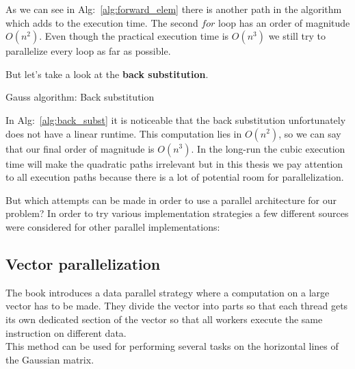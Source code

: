 \documentclass[draft, final]{vutinfth} %
\begin{document}
		As we can see in Alg:~\ref{alg:forward_elem} there is another path in the algorithm which adds to the execution time. The second $for$ loop has an order of magnitude $O(n^2)$. Even though the practical execution time is $O(n^3)$ we still try to parallelize every loop as far as possible.

		But let's take a look at the \textbf{back substitution}.
		\begin{algorithm}[!ht]
			\BlankLine


			\caption{Gauss algorithm: Back substitution}
			\label{alg:back_subst}
		\end{algorithm}

		In Alg:~\ref{alg:back_subst} it is noticeable that the back substitution unfortunately does not have a linear runtime. This computation lies in $O(n^2)$, so we can say that our final order of magnitude is $O(n^3)$. In the long-run the cubic execution time will make the quadratic paths irrelevant but in this thesis we pay attention to all execution paths because there is a lot of potential room for parallelization.

		But which attempts can be made in order to use a parallel architecture for our problem? In order to try various implementation strategies a few different sources were considered for other parallel implementations:

		\subsection{Vector parallelization}
		\label{subsec:vector_par}
			The book \cite{Sanders:2010:CEI:1891996} introduces a data parallel strategy where a computation on a large vector has to be made. They divide the vector into parts so that each thread gets its own dedicated section of the vector so that all workers execute the same instruction on different data.\\
			This method can be used for performing several tasks on the horizontal lines of the Gaussian matrix.
\end{document}
